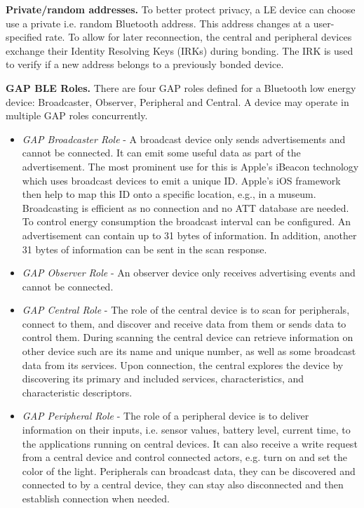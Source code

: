 \textbf{Private/random addresses.}
To better protect privacy, a LE device can choose use a private i.e. random Bluetooth address. This address changes at a user-specified rate. To allow for later reconnection, the central and peripheral devices exchange their Identity Resolving Keys (IRKs) during bonding. The IRK is used to verify if a new address belongs to a previously bonded device.

\textbf{GAP BLE Roles.}
There are four GAP roles defined for a Bluetooth low energy device: Broadcaster, Observer, Peripheral and Central. A device may operate in multiple GAP roles concurrently.
\begin{itemize}
\item \emph{GAP Broadcaster Role} - A broadcast device only sends advertisements and cannot be connected. It can emit some useful data as part of the advertisement. The most prominent use for this is Apple's iBeacon technology which uses broadcast devices to emit a unique ID. Apple's iOS framework then help to map this ID onto a specific location, e.g., in a museum. Broadcasting is efficient as no connection and no ATT database are needed. To control energy consumption the broadcast interval can be configured. An advertisement can contain up to 31 bytes of information. In addition, another 31 bytes of information can be sent in the scan response.
\item \emph{GAP Observer Role} - An observer device only receives advertising events and cannot be connected. 
\item \emph{GAP Central Role} - The role of the central device is to scan for peripherals, connect to them, and discover and receive data from them or sends data to control them. During scanning the central device can retrieve information on other device such are its name and unique number, as well as some broadcast data from its services. Upon connection, the central explores the device by discovering its primary and included services, characteristics, and characteristic descriptors.
\item \emph{GAP Peripheral Role} - The role of a peripheral device is to deliver information on their inputs, i.e. sensor values, battery level, current time, to the applications running on central devices. It can also receive a write request from a central device and control connected actors, e.g. turn on and set the color of the light. Peripherals can broadcast data, they can be discovered and connected to by a central device, they can stay also disconnected and then establish connection when needed. 
\end{itemize} 


